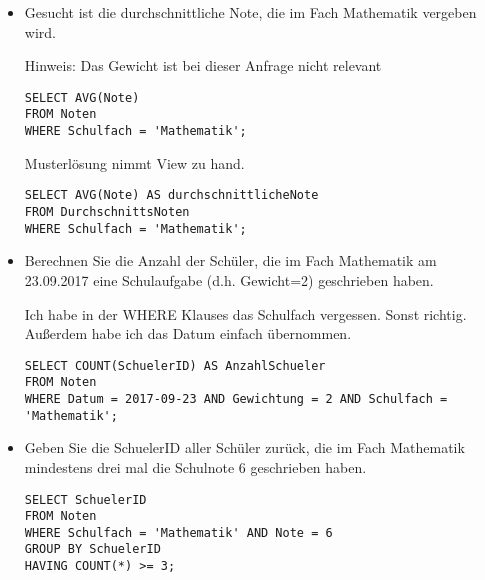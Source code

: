 \documentclass{lehramt-informatik-haupt}
\begin{document}
\begin{enumerate}
\begin{itemize}

%

\item Gesucht ist die durchschnittliche Note, die im Fach Mathematik
vergeben wird.

Hinweis: Das Gewicht ist bei dieser Anfrage nicht relevant

\begin{antwort}
\begin{verbatim}
SELECT AVG(Note)
FROM Noten
WHERE Schulfach = 'Mathematik';
\end{verbatim}
\end{antwort}

Musterlösung nimmt View zu hand.

\begin{antwort}[muster]
\begin{verbatim}
SELECT AVG(Note) AS durchschnittlicheNote
FROM DurchschnittsNoten
WHERE Schulfach = 'Mathematik';
\end{verbatim}
\end{antwort}

%

\item Berechnen Sie die Anzahl der Schüler, die im Fach Mathematik am
23.09.2017 eine Schulaufgabe (d.h. Gewicht=2) geschrieben haben.

\begin{antwort}[muster]
Ich habe in der WHERE Klauses das Schulfach vergessen. Sonst richtig.
Außerdem habe ich das Datum einfach übernommen.
\begin{verbatim}
SELECT COUNT(SchuelerID) AS AnzahlSchueler
FROM Noten
WHERE Datum = 2017-09-23 AND Gewichtung = 2 AND Schulfach = 'Mathematik';
\end{verbatim}
\end{antwort}

%

\item Geben Sie die SchuelerID aller Schüler zurück, die im Fach
Mathematik mindestens drei mal die Schulnote 6 geschrieben haben.

\begin{antwort}[muster]
\begin{verbatim}
SELECT SchuelerID
FROM Noten
WHERE Schulfach = 'Mathematik' AND Note = 6
GROUP BY SchuelerID
HAVING COUNT(*) >= 3;
\end{verbatim}
\end{antwort}


\end{itemize}
\end{enumerate}
\end{document}
